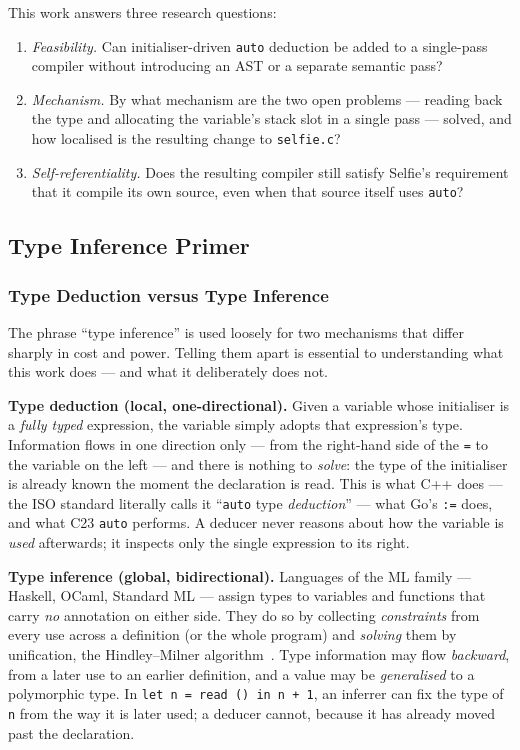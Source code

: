 \documentclass[a4paper,11pt]{article}
\begin{document}
This work answers three research questions:

\begin{enumerate}[leftmargin=*, label=\textbf{RQ\arabic*.}]
  \item \emph{Feasibility.} Can initialiser-driven \texttt{auto} deduction be added to a single-pass compiler without introducing an AST or a separate semantic pass?
  \item \emph{Mechanism.} By what mechanism are the two open problems --- reading back the type and allocating the variable's stack slot in a single pass --- solved, and how localised is the resulting change to \texttt{selfie.c}?
  \item \emph{Self-referentiality.} Does the resulting compiler still satisfy Selfie's requirement that it compile its own source, even when that source itself uses \texttt{auto}?
\end{enumerate}

\subsection{Type Inference Primer}
\label{sec:primer}

\subsubsection{Type Deduction versus Type Inference}
\label{sec:deduction-vs-inference}

The phrase ``type inference'' is used loosely for two mechanisms that differ sharply in cost and power. Telling them apart is essential to understanding what this work does --- and what it deliberately does not.

\textbf{Type deduction (local, one-directional).} Given a variable whose initialiser is a \emph{fully typed} expression, the variable simply adopts that expression's type. Information flows in one direction only --- from the right-hand side of the \texttt{=} to the variable on the left --- and there is nothing to \emph{solve}: the type of the initialiser is already known the moment the declaration is read. This is what C++ does --- the ISO standard literally calls it ``\texttt{auto} type \emph{deduction}'' \cite{cppstd} --- what Go's \texttt{:=} does, and what C23 \texttt{auto} \cite{c23} performs. A deducer never reasons about how the variable is \emph{used} afterwards; it inspects only the single expression to its right.

\textbf{Type inference (global, bidirectional).} Languages of the ML family --- Haskell, OCaml, Standard ML --- assign types to variables and functions that carry \emph{no} annotation on either side. They do so by collecting \emph{constraints} from every use across a definition (or the whole program) and \emph{solving} them by unification, the Hindley--Milner algorithm~\cite{hindleymilner}. Type information may flow \emph{backward}, from a later use to an earlier definition, and a value may be \emph{generalised} to a polymorphic type. In \texttt{let n = read () in n + 1}, an inferrer can fix the type of \texttt{n} from the way it is later used; a deducer cannot, because it has already moved past the declaration.
\end{document}
